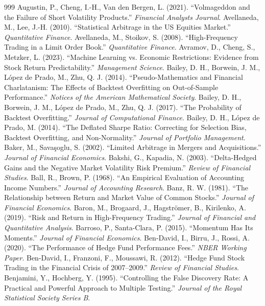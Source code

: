 \begin{thebibliography}{999}
 Augustin, P., Cheng, I.-H., Van den Bergen, L. (2021). ``Volmageddon and the Failure of Short Volatility Products.'' \textit{Financial Analysts Journal}.
 Avellaneda, M., Lee, J.-H. (2010). ``Statistical Arbitrage in the US Equities Market.'' \textit{Quantitative Finance}.
 Avellaneda, M., Stoikov, S. (2008). ``High-Frequency Trading in a Limit Order Book.'' \textit{Quantitative Finance}.
 Avramov, D., Cheng, S., Metzker, L. (2023). ``Machine Learning vs. Economic Restrictions: Evidence from Stock Return Predictability.'' \textit{Management Science}.
 Bailey, D. H., Borwein, J. M., López de Prado, M., Zhu, Q. J. (2014). ``Pseudo-Mathematics and Financial Charlatanism: The Effects of Backtest Overfitting on Out-of-Sample Performance.'' \textit{Notices of the American Mathematical Society}.
 Bailey, D. H., Borwein, J. M., López de Prado, M., Zhu, Q. J. (2017). ``The Probability of Backtest Overfitting.'' \textit{Journal of Computational Finance}.
 Bailey, D. H., López de Prado, M. (2014). ``The Deflated Sharpe Ratio: Correcting for Selection Bias, Backtest Overfitting, and Non-Normality.'' \textit{Journal of Portfolio Management}.
 Baker, M., Savaşoglu, S. (2002). ``Limited Arbitrage in Mergers and Acquisitions.'' \textit{Journal of Financial Economics}.
 Bakshi, G., Kapadia, N. (2003). ``Delta-Hedged Gains and the Negative Market Volatility Risk Premium.'' \textit{Review of Financial Studies}.
 Ball, R., Brown, P. (1968). ``An Empirical Evaluation of Accounting Income Numbers.'' \textit{Journal of Accounting Research}.
 Banz, R. W. (1981). ``The Relationship between Return and Market Value of Common Stocks.'' \textit{Journal of Financial Economics}.
 Baron, M., Brogaard, J., Hagströmer, B., Kirilenko, A. (2019). ``Risk and Return in High-Frequency Trading.'' \textit{Journal of Financial and Quantitative Analysis}.
 Barroso, P., Santa-Clara, P. (2015). ``Momentum Has Its Moments.'' \textit{Journal of Financial Economics}.
 Ben-David, I., Birru, J., Rossi, A. (2020). ``The Performance of Hedge Fund Performance Fees.'' \textit{NBER Working Paper}.
 Ben-David, I., Franzoni, F., Moussawi, R. (2012). ``Hedge Fund Stock Trading in the Financial Crisis of 2007–2009.'' \textit{Review of Financial Studies}.
 Benjamini, Y., Hochberg, Y. (1995). ``Controlling the False Discovery Rate: A Practical and Powerful Approach to Multiple Testing.'' \textit{Journal of the Royal Statistical Society Series B}.

\end{thebibliography}
